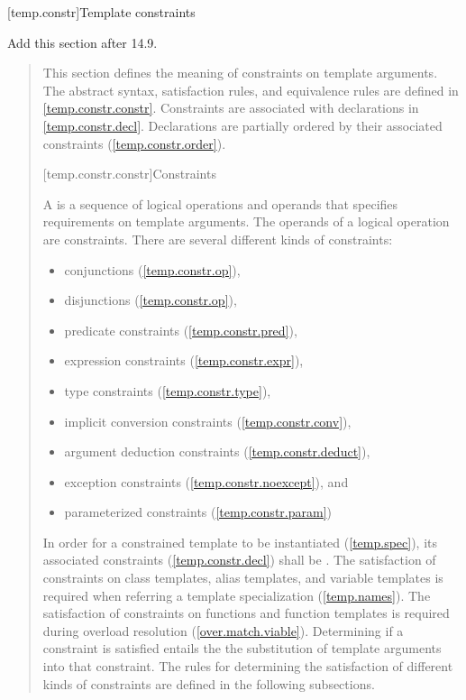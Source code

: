
[temp.constr]{Template constraints}

Add this section after 14.9.

\begin{quote}

\pnum
\enternote
This section defines the meaning of constraints on template arguments.
% 
The abstract syntax, satisfaction rules, and equivalence rules are defined
in \ref{temp.constr.constr}. 
% 
Constraints are associated with declarations in \ref{temp.constr.decl}.
% 
Declarations are partially ordered by their associated constraints 
(\ref{temp.constr.order}).
\exitnote


[temp.constr.constr]{Constraints}

\pnum
A  is a sequence of logical operations and 
operands that specifies requirements on template arguments.
\enternote The operands of a logical operation are constraints. \exitnote
% 
There are several different kinds of constraints:
\begin{itemize}
\item conjunctions (\ref{temp.constr.op}),
\item disjunctions (\ref{temp.constr.op}),
\item predicate constraints (\ref{temp.constr.pred}),
\item expression constraints (\ref{temp.constr.expr}),
\item type constraints (\ref{temp.constr.type}),
\item implicit conversion constraints (\ref{temp.constr.conv}),
\item argument deduction constraints (\ref{temp.constr.deduct}),
\item exception constraints (\ref{temp.constr.noexcept}), and
\item parameterized constraints (\ref{temp.constr.param})
\end{itemize}

\pnum
In order for a constrained template to be instantiated (\ref{temp.spec}), its 
associated constraints (\ref{temp.constr.decl}) shall be .
% 
\enternote
The satisfaction of constraints on class templates, alias templates, 
and variable templates is required when referring a template specialization 
(\ref{temp.names}). The satisfaction of constraints on functions and
function templates is required during overload resolution (\ref{over.match.viable}).
\exitnote
% 
Determining if a constraint is satisfied entails the the substitution 
of template arguments into that constraint.
% 
The rules for determining the satisfaction of different kinds of 
constraints are defined in the following subsections.


\end{quote}
